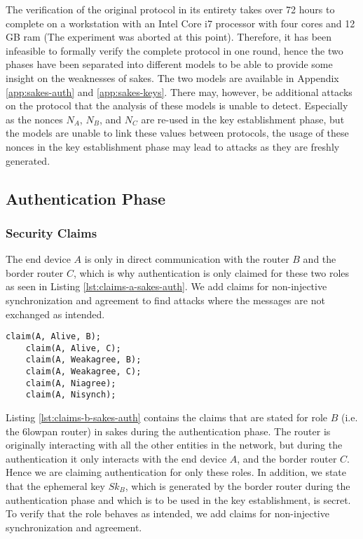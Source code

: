 The verification of the original protocol in its entirety takes over 72 hours to complete on a workstation with an Intel Core i7 processor with four cores and 12 GB \gls{ram} (The experiment was aborted at this point). Therefore, it has been infeasible to formally verify the complete protocol in one round, hence the two phases have been separated into different models to be able to provide some insight on the weaknesses of \gls{sakes}. The two models are available in Appendix \ref{app:sakes-auth} and \ref{app:sakes-keys}. There may, however, be additional attacks on the protocol that the analysis of these models is unable to detect. Especially as the nonces $N_A$, $N_B$, and $N_C$ are re-used in the key establishment phase, but the models are unable to link these values between protocols, the usage of these nonces in the key establishment phase may lead to attacks as they are freshly generated.


\subsection{Authentication Phase}
\label{subsec:sakes-auth}

\subsubsection{Security Claims}

The end device $A$ is only in direct communication with the router $B$ and the border router $C$, which is why authentication is only claimed for these two roles as seen in Listing \ref{lst:claims-a-sakes-auth}. We add claims for non-injective synchronization and agreement to find attacks where the messages are not exchanged as intended.\\

\begin{lstlisting}[caption={Security claims for role A during the authentication phase in SAKES.}, label={lst:claims-a-sakes-auth}]
	claim(A, Alive, B);
	claim(A, Alive, C);
	claim(A, Weakagree, B);
	claim(A, Weakagree, C);
	claim(A, Niagree);
	claim(A, Nisynch);
\end{lstlisting}


Listing \ref{lst:claims-b-sakes-auth} contains the claims that are stated for role $B$ (i.e. the \gls{6lowpan} router) in \gls{sakes} during the authentication phase. The router is originally interacting with all the other entities in the network, but during the authentication it only interacts with the end device $A$, and the border router $C$. Hence we are claiming authentication for only these roles. In addition, we state that the ephemeral key $Sk_B$, which is generated by the border router during the authentication phase and which is to be used in the key establishment, is secret. To verify that the role behaves as intended, we add claims for non-injective synchronization and agreement.\\

